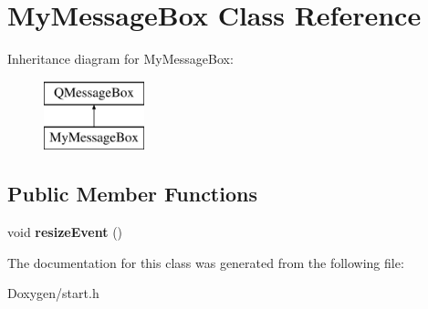 \hypertarget{class_my_message_box}{\section{My\-Message\-Box Class Reference}
\label{class_my_message_box}
}
Inheritance diagram for My\-Message\-Box\-:\begin{figure}[H]
\begin{center}
\leavevmode
\includegraphics[height=2.000000cm]{class_my_message_box}
\end{center}
\end{figure}
\subsection*{Public Member Functions}
\begin{DoxyCompactItemize}
\item 
\hypertarget{class_my_message_box_a5f2ebba721994e0b991449265daf55fd}{void {\bfseries resize\-Event} ()}\label{class_my_message_box_a5f2ebba721994e0b991449265daf55fd}

\end{DoxyCompactItemize}


The documentation for this class was generated from the following file\-:\begin{DoxyCompactItemize}
\item 
Doxygen/start.\-h\end{DoxyCompactItemize}
